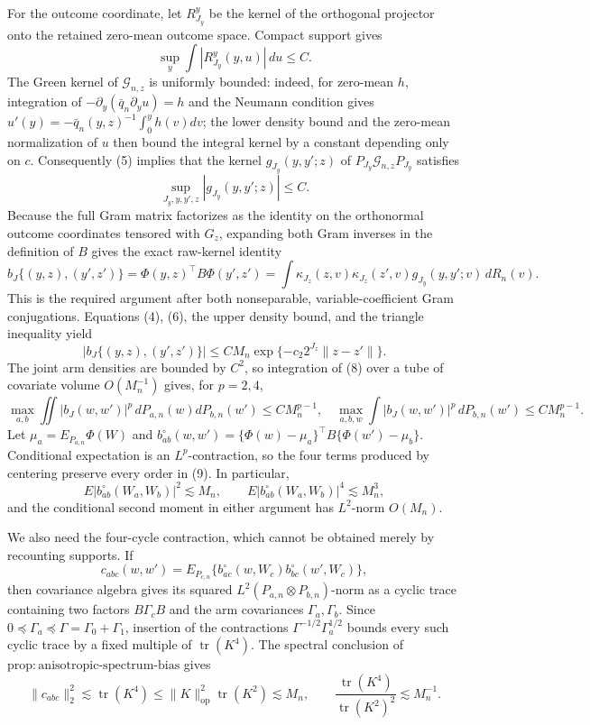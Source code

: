 For the outcome coordinate, let \(R^y_{J_y}\) be the kernel of the orthogonal projector onto the retained zero-mean outcome space.  Compact support gives
\[
\sup_y\int|R^y_{J_y}(y,u)|\,du\le C.
\tag{5}
\]
The Green kernel of \(\mathcal G_{n,z}\) is uniformly bounded: indeed, for zero-mean \(h\), integration of
\(-\partial_y(\bar q_n\partial_yu)=h\) and the Neumann condition gives
\(u'(y)=-\bar q_n(y,z)^{-1}\int_0^yh(v)dv\); the lower density bound and the zero-mean normalization of \(u\) then bound the integral kernel by a constant depending only on \(c\).  Consequently (5) implies that the kernel \(g_{J_y}(y,y';z)\) of \(P_{J_y}\mathcal G_{n,z}P_{J_y}\) satisfies
\[
\sup_{J_y,y,y',z}|g_{J_y}(y,y';z)|\le C.
\tag{6}
\]
Because the full Gram matrix factorizes as the identity on the orthonormal outcome coordinates tensored with \(G_z\), expanding both Gram inverses in the definition of \(B\) gives the exact raw-kernel identity
\[
b_J\{(y,z),(y',z')\}
=\Phi(y,z)^{\top}B\Phi(y',z')
=\int\kappa_{J_z}(z,v)\kappa_{J_z}(z',v)
g_{J_y}(y,y';v)\,dR_n(v).
\tag{7}
\]
This is the required argument after both nonseparable, variable-coefficient Gram conjugations.  Equations (4), (6), the upper density bound, and the triangle inequality yield
\[
|b_J\{(y,z),(y',z')\}|
\le C M_n\exp\{-c_2 2^{J_z}\|z-z'\|\}.
\tag{8}
\]
The joint arm densities are bounded by \(C^2\), so integration of (8) over a tube of covariate volume \(O(M_n^{-1})\) gives, for \(p=2,4\),
\[
\max_{a,b}\iint|b_J(w,w')|^p\,dP_{a,n}(w)dP_{b,n}(w')
\le C M_n^{p-1},
\quad
\max_{a,b,w}\int|b_J(w,w')|^p\,dP_{b,n}(w')
\le C M_n^{p-1}.
\tag{9}
\]
Let \(\mu_a=E_{P_{a,n}}\Phi(W)\) and
\(b_{ab}^{\circ}(w,w')=\{\Phi(w)-\mu_a\}^{\top}B\{\Phi(w')-\mu_b\}\).
Conditional expectation is an \(L^p\)-contraction, so the four terms produced by centering preserve every order in (9).  In particular,
\[
E|b_{ab}^{\circ}(W_a,W_b)|^2\lesssim M_n,
\qquad
E|b_{ab}^{\circ}(W_a,W_b)|^4\lesssim M_n^3,
\tag{10}
\]
and the conditional second moment in either argument has \(L^2\)-norm \(O(M_n)\).

We also need the four-cycle contraction, which cannot be obtained merely by recounting supports.  If
\[
c_{abc}(w,w')=E_{P_{c,n}}
\{b_{ac}^{\circ}(w,W_c)b_{bc}^{\circ}(w',W_c)\},
\]
then covariance algebra gives its squared \(L^2(P_{a,n}\otimes P_{b,n})\)-norm as a cyclic trace containing two factors \(B\Gamma_cB\) and the arm covariances \(\Gamma_a,\Gamma_b\).  Since \(0\preceq\Gamma_a\preceq\Gamma=\Gamma_0+\Gamma_1\), insertion of the contractions \(\Gamma^{-1/2}\Gamma_a^{1/2}\) bounds every such cyclic trace by a fixed multiple of \(\operatorname{tr}(K^4)\).  The spectral conclusion of \(\mathrm{prop{:}anisotropic\text{-}spectrum\text{-}bias}\) gives
\[
\|c_{abc}\|_2^2\lesssim\operatorname{tr}(K^4)
\le\|K\|_{\mathrm{op}}^2\operatorname{tr}(K^2)\lesssim M_n,
\qquad
\frac{\operatorname{tr}(K^4)}{\operatorname{tr}(K^2)^2}\lesssim M_n^{-1}.
\tag{11}
\]

